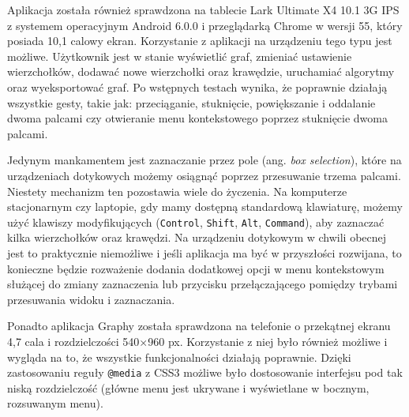 Aplikacja została również sprawdzona na tablecie Lark Ultimate X4 10.1 3G IPS z systemem operacyjnym Android 6.0.0 i przeglądarką Chrome w wersji 55, który posiada 10,1 calowy ekran. Korzystanie z aplikacji na urządzeniu tego typu jest możliwe. Użytkownik jest w stanie wyświetlić graf, zmieniać ustawienie wierzchołków, dodawać nowe wierzchołki oraz krawędzie, uruchamiać algorytmy oraz wyeksportować graf. Po wstępnych testach wynika, że poprawnie działają wszystkie gesty, takie jak: przeciąganie, stuknięcie, powiększanie i oddalanie dwoma palcami czy otwieranie menu kontekstowego poprzez stuknięcie dwoma palcami. 

Jedynym mankamentem jest zaznaczanie przez pole (ang. \textit{box selection}), które na urządzeniach dotykowych możemy osiągnąć poprzez przesuwanie trzema palcami. Niestety mechanizm ten pozostawia wiele do życzenia. Na komputerze stacjonarnym czy laptopie, gdy mamy dostępną standardową klawiaturę, możemy użyć klawiszy modyfikujących (\texttt{Control}, \texttt{Shift}, \texttt{Alt}, \texttt{Command}), aby zaznaczać kilka wierzchołków oraz krawędzi. Na urządzeniu dotykowym w chwili obecnej jest to praktycznie niemożliwe i jeśli aplikacja ma być w przyszłości rozwijana, to konieczne będzie rozważenie dodania dodatkowej opcji w menu kontekstowym służącej do zmiany zaznaczenia lub przycisku przełączającego pomiędzy trybami przesuwania widoku i zaznaczania. 

Ponadto aplikacja Graphy została sprawdzona na telefonie o przekątnej ekranu 4,7 cala i rozdzielczości 540$\times$960 px. Korzystanie z niej było również możliwe i wygląda na to, że wszystkie funkcjonalności działają poprawnie. Dzięki zastosowaniu reguły \texttt{@media} z CSS3 możliwe było dostosowanie interfejsu pod tak niską rozdzielczość (główne menu jest ukrywane i wyświetlane w bocznym, rozsuwanym menu). 

